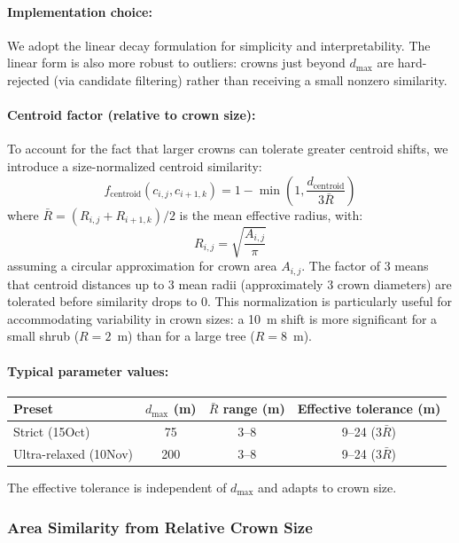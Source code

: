 \paragraph{Implementation choice:} We adopt the linear decay formulation for simplicity and interpretability. The linear form is also more robust to outliers: crowns just beyond $d_{\max}$ are hard-rejected (via candidate filtering) rather than receiving a small nonzero similarity.

\paragraph{Centroid factor (relative to crown size):}
To account for the fact that larger crowns can tolerate greater centroid shifts, we introduce a size-normalized centroid similarity:
\[
f_{\text{centroid}}(c_{i,j}, c_{i+1,k}) = 1 - \min\left(1, \frac{d_{\text{centroid}}}{3\bar{R}}\right)
\]
where $\bar{R} = (R_{i,j} + R_{i+1,k})/2$ is the mean effective radius, with:
\[
R_{i,j} = \sqrt{\frac{A_{i,j}}{\pi}}
\]
assuming a circular approximation for crown area $A_{i,j}$. The factor of 3 means that centroid distances up to 3 mean radii (approximately 3 crown diameters) are tolerated before similarity drops to 0. This normalization is particularly useful for accommodating variability in crown sizes: a 10~m shift is more significant for a small shrub ($R = 2$~m) than for a large tree ($R = 8$~m).

\paragraph{Typical parameter values:}
\begin{center}
\begin{tabular}{lccc}
\toprule
Preset & $d_{\max}$ (m) & $\bar{R}$ range (m) & Effective tolerance (m) \\
\midrule
Strict (15Oct) & 75 & 3--8 & 9--24 ($3\bar{R}$) \\
Ultra-relaxed (10Nov) & 200 & 3--8 & 9--24 ($3\bar{R}$) \\
\bottomrule
\end{tabular}
\end{center}
The effective tolerance is independent of $d_{\max}$ and adapts to crown size.

\subsubsection{Area Similarity from Relative Crown Size}

